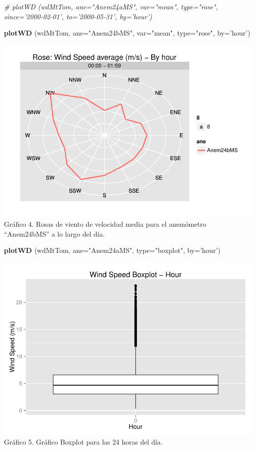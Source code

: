 \documentclass[]{article}
\newenvironment{Shaded}{\begin{snugshade}}{\end{snugshade}}
\newcommand{\KeywordTok}[1]{\textcolor[rgb]{0.13,0.29,0.53}{\textbf{{#1}}}}
\newcommand{\DataTypeTok}[1]{\textcolor[rgb]{0.13,0.29,0.53}{{#1}}}
\newcommand{\StringTok}[1]{\textcolor[rgb]{0.31,0.60,0.02}{{#1}}}
\newcommand{\CommentTok}[1]{\textcolor[rgb]{0.56,0.35,0.01}{\textit{{#1}}}}
\newcommand{\NormalTok}[1]{{#1}}
\begin{document}
\begin{Shaded}
\begin{Highlighting}[]
\CommentTok{# plotWD (wdMtTom, ane="Anem24aMS", var="mean", type="rose", since='2000-02-01', to='2000-05-31', by='hour')}

\KeywordTok{plotWD} \NormalTok{(wdMtTom, }\DataTypeTok{ane=}\StringTok{"Anem24bMS"}\NormalTok{, }\DataTypeTok{var=}\StringTok{"mean"}\NormalTok{, }\DataTypeTok{type=}\StringTok{"rose"}\NormalTok{,  }\DataTypeTok{by=}\StringTok{'hour'}\NormalTok{)}
\end{Highlighting}
\end{Shaded}

\includegraphics{Manual_WindResource_files/figure-latex/unnamed-chunk-12-1.pdf}
Gráfico 4. Rosas de viento de velocidad media para el anemómetro
``Anem24bMS'' a lo largo del día.

\begin{Shaded}
\begin{Highlighting}[]
\KeywordTok{plotWD} \NormalTok{(wdMtTom, }\DataTypeTok{ane=}\StringTok{"Anem24aMS"}\NormalTok{,  }\DataTypeTok{type=}\StringTok{"boxplot"}\NormalTok{, }\DataTypeTok{by=}\StringTok{'hour'}\NormalTok{)}
\end{Highlighting}
\end{Shaded}

\includegraphics{Manual_WindResource_files/figure-latex/unnamed-chunk-13-1.pdf}
Gráfico 5. Gráfico Boxplot para las 24 horas del día.
\end{document}
